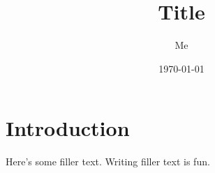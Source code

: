 \documentclass[]{IEEEtran}
\title{Title}
\author{Me}
\date{\today}
\begin{document}
\maketitle

\section{Introduction}

Here's some filler text. Writing filler text is fun.
\end{document}
